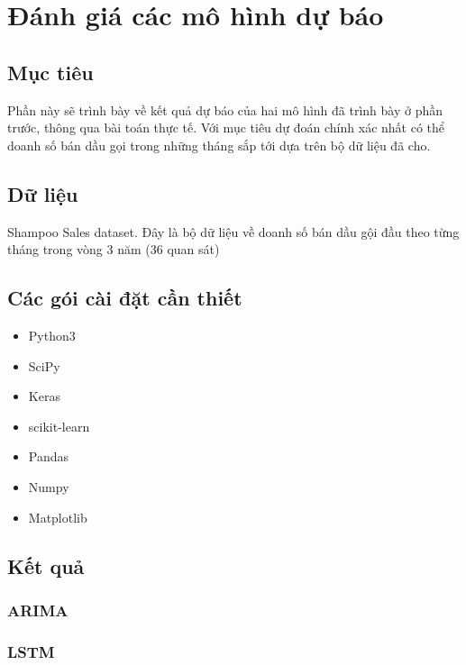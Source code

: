 \chapter{Đánh giá các mô hình dự báo}


\section{Mục tiêu}


Phần này sẽ trình bày về kết quả dự báo của hai mô hình đã trình bày ở phần trước, thông qua bài toán thực tế. Với mục tiêu dự đoán chính xác nhất có thể doanh số bán dầu gọi trong những tháng sắp tới dựa trên bộ dữ liệu đã cho.

\section{Dữ liệu}

Shampoo Sales dataset. Đây là bộ dữ liệu về doanh số bán dầu gội đầu theo từng tháng trong vòng 3 năm (36 quan sát)

\section{Các gói cài đặt cần thiết}

\begin{itemize}
	\item Python3
	\item SciPy
	\item Keras
	\item scikit-learn
	\item Pandas
	\item Numpy
	\item Matplotlib
\end{itemize}

\section{Kết quả}

\subsection{ARIMA}

\subsection{LSTM}